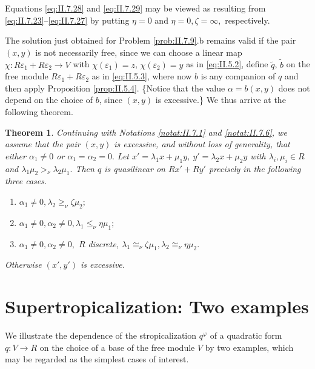 \documentclass [12pt,a4paper,reqno]{amsart}
\newtheorem{thm}{Theorem} [section]
\begin{document}
Equations \eqref{eq:II.7.28} and \eqref{eq:II.7.29} may be viewed as resulting from \eqref{eq:II.7.23}--\eqref{eq:II.7.27} by putting $\eta = 0$ and $\eta = 0, {\zeta} = \infty,$ respectively. {\vskip 1.5mm \noindent}

The solution just  obtained for  Problem \ref{prob:II.7.9}.b remains valid if the pair $(x,y)$ is not necessarily free, since we can choose a linear map
$\chi : R {\varepsilon}_1 + R {\varepsilon}_2 \to V$  with $\chi({\varepsilon}_1) = z$, $\chi({\varepsilon}_2) = y$ as in \eqref{eq:II.5.2}, define ${\tilde q}$, ${\tilde b}$ on the free module   $R {\varepsilon}_1 + R {\varepsilon}_2$ as in \eqref{eq:II.5.3}, where now $b$ is any companion of $q$ and then apply Proposition \ref{prop:II.5.4}. \{Notice that the value ${\alpha} = b(x,y)$ does not depend on the choice of $b$, since $(x,y)$ is excessive.\} We thus arrive at the following theorem.

\begin{thm}\label{thm:II.7.10} Continuing with Notations \ref{notat:II.7.1} and \ref{notat:II.7.6}, we assume that the pair
$(x,y)$ is excessive, and without loss of generality, that either ${\alpha}_1 \neq 0$ or ${\alpha}_1 = {\alpha}_2 = 0.$ Let
$x' = {\lambda}_1 x + \mu_1 y$, $y' = {\lambda}_2 x + \mu_2 y$ with ${\lambda}_i, \mu_i \in R$ and ${\lambda}_1 \mu_2 {>_\nu} {\lambda}_2 \mu_1.$
Then $q$ is quasilinear on $Rx' + Ry'$ precisely in the following three cases.
\begin{enumerate}
  \item[1)] ${\alpha}_1 \neq 0, {\lambda}_2 {\geq_\nu} {\zeta} \mu_2;${\vskip 1.5mm \noindent}
  \item[2)] ${\alpha}_1 \neq 0, {\alpha}_2 \neq 0, {\lambda}_1 {\leq_\nu} \eta \mu_1;$ {\vskip 1.5mm \noindent}
  \item[3)] ${\alpha}_1 \neq 0, {\alpha}_2 \neq 0,$ $R$ discrete,   ${\lambda}_1 {\cong_\nu}  {\zeta} \mu_1, {\lambda}_2 {\cong_\nu} \eta \mu_2.$
\end{enumerate}
Otherwise $(x',y')$ is excessive.
\end{thm}

\section{Supertropicalization: Two examples}\label{sec:II.8}

We illustrate the dependence of the stropicalization $q^{\varphi}$ of a quadratic form $q: V\to R$ on the choice of a base of the free module $V$ by two examples, which may be regarded as the simplest cases of interest.
\end{document}
